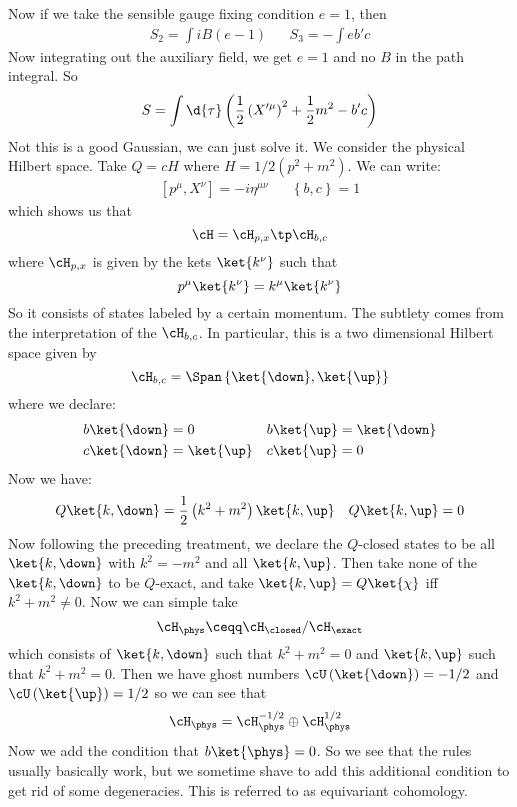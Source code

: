 \documentclass{booc}
\begin{document}
\begin{exm}
Now if we take the sensible gauge fixing condition $e = 1$, then
\begin{align}
S_2 = \int i B\left( e - 1 \right)
&&
S_3 = -\int e b' c
\end{align}
Now integrating out the auxiliary field, we get $e = 1$
and no $B$ in the path integral. So 
\begin{equation}
S = \int \d{\tau} \left( 
\frac{1}{2} \left( X'^\mu  \right)^2 + \frac{1}{2} m^2 - b' c\right)
\end{equation}
Not this is a good Gaussian, we can just solve it.
We consider the physical Hilbert space. 
Take $Q = cH$ where 
$H = 1/2\left( p^2 + m^2 \right)$. 
We can write:
\begin{align}
\left[ p^\mu , X^\nu \right] = -i \eta^{\mu\nu}
&&
\left\{ b ,c \right\} = 1
\end{align}
which shows us that
\begin{equation}
\cH = \cH_{p,x} \tp \cH_{b,c}
\end{equation}
where $\cH_{p,x}$ is given by the kets $\ket{k^\nu}$ such that
\begin{equation}
p^\mu \ket{k^\nu} = k^\mu \ket{k^\nu}
\end{equation}
So it consists of states labeled by a certain momentum.
The subtlety comes from the interpretation of the $\cH_{b,c}$.
In particular, this is a two dimensional Hilbert space given by 
\begin{equation}
\cH_{b,c} = \Span\left\{ 
\ket{\down} , \ket{\up}\right\}
\end{equation}
where we declare:
\begin{align}
b\ket{\down} &= 0
& 
b\ket{\up} &= \ket{\down} \\
c\ket{\down} &=\ket{\up}
& 
c\ket{\up} &= 0
\end{align}
Now we have:
\begin{align}
Q\ket{k , \down} = \frac{1}{2}\left( k^2 + m^2 \right)\ket{k , \up}
&&
Q\ket{k , \up} = 0
\end{align}
Now following the preceding treatment, we declare the $Q$-closed states
to be all $\ket{k , \down}$ with $k^2 = -m^2$ and all $\ket{k , \up}$. 
Then take none of the $\ket{k , \down}$ to be $Q$-exact, and take 
$\ket{k , \up} = Q\ket{\chi}$ iff $k^2 + m^2 \neq 0$. 
Now we can simple take
\begin{equation}
\cH_{\phys} \ceqq \cH_{\closed} / \cH_{\exact} 
\end{equation}
which consists of $\ket{k ,\down}$ such that $k^2 + m^2 = 0$
and $\ket{k , \up}$ such that $k^2 + m^2 = 0$.
Then we have ghost numbers $\cU\left( \ket{\down} \right) = -1/2$ and
$\cU\left( \ket{\up} \right) = 1/2$ so we can see that
\begin{equation}
\cH_{\phys} = \cH_{\phys}^{-1/2} \oplus \cH_{\phys}^{1/2}
\end{equation}
Now we add the condition that $b\ket{\phys} = 0$. 
So we see that the rules usually basically work, but we sometime shave to add
this additional condition to get rid of some degeneracies. 
This is referred to as equivariant cohomology.
\end{exm}
\end{document}

